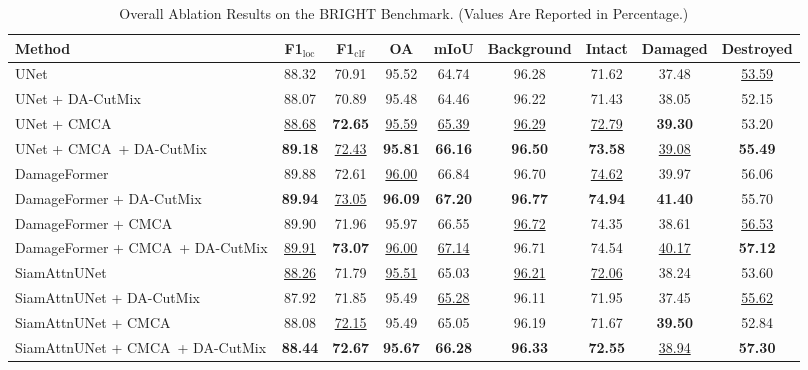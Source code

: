 \documentclass[journal]{IEEEtran}
\newcommand{\cmca}{CMCA}
\newcommand{\dacutmix}{DA-CutMix}
\begin{document}
    \begin{table}[!t]
    \caption{Overall Ablation Results on the BRIGHT Benchmark. (Values Are Reported in Percentage.)}
    \label{tab:overall_ablation}
    \centering
    \scriptsize
    \setlength{\tabcolsep}{2.6pt}
    \renewcommand{\arraystretch}{0.96}
    \begin{tabular}{lcccccccc}
    \toprule
    Method & F1$_{\mathrm{loc}}$ & F1$_{\mathrm{clf}}$ & OA & mIoU & Background & Intact & Damaged & Destroyed \\
    \midrule
    UNet & 88.32 & 70.91 & 95.52 & 64.74 & 96.28 & 71.62 & 37.48 & \underline{53.59} \\
    UNet + \dacutmix & 88.07 & 70.89 & 95.48 & 64.46 & 96.22 & 71.43 & 38.05 & 52.15 \\
    UNet + \cmca & \underline{88.68} & \textbf{72.65} & \underline{95.59} & \underline{65.39} & \underline{96.29} & \underline{72.79} & \textbf{39.30} & 53.20 \\
    UNet + \cmca\ + \dacutmix & \textbf{89.18} & \underline{72.43} & \textbf{95.81} & \textbf{66.16} & \textbf{96.50} & \textbf{73.58} & \underline{39.08} & \textbf{55.49} \\
    \midrule
    DamageFormer & 89.88 & 72.61 & \underline{96.00} & 66.84 & 96.70 & \underline{74.62} & 39.97 & 56.06 \\
    DamageFormer + \dacutmix & \textbf{89.94} & \underline{73.05} & \textbf{96.09} & \textbf{67.20} & \textbf{96.77} & \textbf{74.94} & \textbf{41.40} & 55.70 \\
    DamageFormer + \cmca & 89.90 & 71.96 & 95.97 & 66.55 & \underline{96.72} & 74.35 & 38.61 & \underline{56.53} \\
    DamageFormer + \cmca\ + \dacutmix & \underline{89.91} & \textbf{73.07} & \underline{96.00} & \underline{67.14} & 96.71 & 74.54 & \underline{40.17} & \textbf{57.12} \\
    \midrule
    SiamAttnUNet & \underline{88.26} & 71.79 & \underline{95.51} & 65.03 & \underline{96.21} & \underline{72.06} & 38.24 & 53.60 \\
    SiamAttnUNet + \dacutmix & 87.92 & 71.85 & 95.49 & \underline{65.28} & 96.11 & 71.95 & 37.45 & \underline{55.62} \\
    SiamAttnUNet + \cmca & 88.08 & \underline{72.15} & 95.49 & 65.05 & 96.19 & 71.67 & \textbf{39.50} & 52.84 \\
    SiamAttnUNet + \cmca\ + \dacutmix & \textbf{88.44} & \textbf{72.67} & \textbf{95.67} & \textbf{66.28} & \textbf{96.33} & \textbf{72.55} & \underline{38.94} & \textbf{57.30} \\

\end{tabular}
\end{table}
\end{document}
